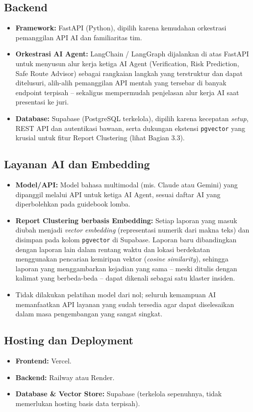 \documentclass[11pt,a4paper]{article}
\begin{document}
\subsection{Backend}
\begin{itemize}
  \item \textbf{Framework:} FastAPI (Python), dipilih karena kemudahan orkestrasi pemanggilan API AI dan familiaritas tim.
  \item \textbf{Orkestrasi AI Agent:} LangChain / LangGraph dijalankan di atas FastAPI untuk menyusun alur kerja ketiga AI Agent (Verification, Risk Prediction, Safe Route Advisor) sebagai rangkaian langkah yang terstruktur dan dapat ditelusuri, alih-alih pemanggilan API mentah yang tersebar di banyak endpoint terpisah -- sekaligus mempermudah penjelasan alur kerja AI saat presentasi ke juri.
  \item \textbf{Database:} Supabase (PostgreSQL terkelola), dipilih karena kecepatan \textit{setup}, REST API dan autentikasi bawaan, serta dukungan ekstensi \texttt{pgvector} yang krusial untuk fitur Report Clustering (lihat Bagian 3.3).
\end{itemize}

\subsection{Layanan AI dan Embedding}
\begin{itemize}
  \item \textbf{Model/API:} Model bahasa multimodal (mis. Claude atau Gemini) yang dipanggil melalui API untuk ketiga AI Agent, sesuai daftar AI yang diperbolehkan pada guidebook lomba.
  \item \textbf{Report Clustering berbasis Embedding:} Setiap laporan yang masuk diubah menjadi \textit{vector embedding} (representasi numerik dari makna teks) dan disimpan pada kolom \texttt{pgvector} di Supabase. Laporan baru dibandingkan dengan laporan lain dalam rentang waktu dan lokasi berdekatan menggunakan pencarian kemiripan vektor (\textit{cosine similarity}), sehingga laporan yang menggambarkan kejadian yang sama -- meski ditulis dengan kalimat yang berbeda-beda -- dapat dikenali sebagai satu klaster insiden.
  \item Tidak dilakukan pelatihan model dari nol; seluruh kemampuan AI memanfaatkan API layanan yang sudah tersedia agar dapat diselesaikan dalam masa pengembangan yang sangat singkat.
\end{itemize}

\subsection{Hosting dan Deployment}
\begin{itemize}
  \item \textbf{Frontend:} Vercel.
  \item \textbf{Backend:} Railway atau Render.
  \item \textbf{Database \& Vector Store:} Supabase (terkelola sepenuhnya, tidak memerlukan hosting basis data terpisah).
\end{itemize}
\end{document}
